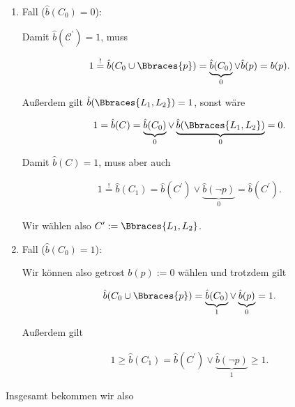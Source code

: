 \begin{solution}
\begin{enumerate}[label = \arabic*.]

    \item Fall ($\hat b(C_0) = 0$):
    
    Damit $\hat b(\mathcal C^\prime) = 1$, muss

    \begin{align*}
        1
        \stackrel{!}{=}
        \hat b(C_0 \cup \Bbraces{p})
        =
        \underbrace{\hat b(C_0)}_0
        \lor
        \hat b(p)
        =
        b(p).
    \end{align*}

    Außerdem gilt $\hat b(\Bbraces{L_1, L_2}) = 1$, sonst wäre

    \begin{align*}
        1
        =
        \hat b(C)
        =
        \underbrace{\hat b(C_0)}_0
        \lor
        \underbrace{\hat b(\Bbraces{L_1, L_2})}_0
        =
        0.
    \end{align*}

    Damit $\hat b(C) = 1$, muss aber auch

    \begin{align*}
        1
        \stackrel{!}{=}
        \hat b(C_1)
        =
        \hat b(C^\prime)
        \lor
        \underbrace{\hat b(\neg p)}_0
        =
        \hat b(C^\prime).
    \end{align*}

    Wir wählen also $C^\prime := \Bbraces{L_1, L_2}$.

    \item Fall ($\hat b(C_0) = 1$):
    
    Wir können also getrost $b(p) := 0$ wählen und trotzdem gilt

    \begin{align*}
        \hat b(C_0 \cup \Bbraces{p})
        =
        \underbrace{\hat b(C_0)}_1
        \lor
        \underbrace{\hat b(p)}_0
        =
        1.
    \end{align*}

    Außerdem gilt

    \begin{align*}
        1
        \geq
        \hat b(C_1)
        =
        \hat b(C^\prime)
        \lor
        \underbrace{\hat b(\neg p)}_1
        \geq
        1.
    \end{align*}

\end{enumerate}

Insgesamt bekommen wir also


\end{solution}

